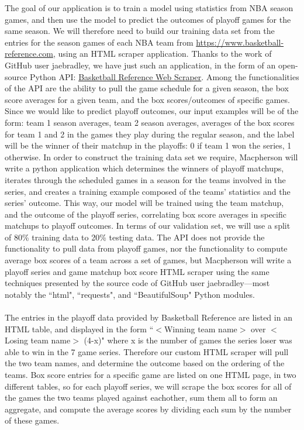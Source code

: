 \documentclass[letterpaper]{article} %
\begin{document}
The goal of our application is to train a model using statistics from NBA season games, and then use the model to predict the outcomes of playoff games for the same season. We will therefore need to build our training data set from the entries for the season games of each NBA team from \href{https://www.basketball-reference.com}{https://www.basketball-reference.com}, using an HTML scraper application. Thanks to the work of GitHub user jaebradley, we have just such an application, in the form of an open-source Python API: \href{https://github.com/jaebradley/basketball_reference_web_scraper}{Basketball Reference Web Scraper}. Among the functionalities of the API are the ability to pull the game schedule for a given season, the box score averages for a given team, and the box scores/outcomes of specific games. Since we would like to predict playoff outcomes, our input examples will be of the form: team 1 season averages, team 2 season averages, averages of the box scores for team 1 and 2 in the games they play during the regular season, and the label will be the winner of their matchup in the playoffs: 0 if team 1 won the series, 1 otherwise. In order to construct the training data set we require, Macpherson will write a python application which determines the winners of playoff matchups, iterates through the scheduled games in a season for the teams involved in the series, and creates a training example composed of the teams’ statistics and the series’ outcome. This way, our model will be trained using the team matchup, and the outcome of the playoff series, correlating box score averages in specific matchups to playoff outcomes. In terms of our validation set, we will use a split of 80\% training data to 20\% testing data. The API does not provide the functionality to pull data from playoff games, nor the functionality to compute average box scores of a team across a set of games, but Macpherson will write a playoff series and game matchup box score HTML scraper using the same techniques presented by the source code of GitHub user jaebradley---most notably the ``html", ``requests", and ``BeautifulSoup" Python modules. \\ \\ 
The entries in the playoff data provided by Basketball Reference are listed in an HTML table, and displayed in the form ``$<$Winning team name$>$ over $<$Losing team name$>$ (4-x)" where x is the number of games the series loser was able to win in the 7 game series. Therefore our custom HTML scraper will pull the two team names, and determine the outcome based on the ordering of the teams. Box score entries for a specific game are listed on one HTML page, in two different tables, so for each playoff series, we will scrape the box scores for all of the games the two teams played against eachother, sum them all to form an aggregate, and compute the average scores by dividing each sum by the number of these games. \\ \\
\end{document}
